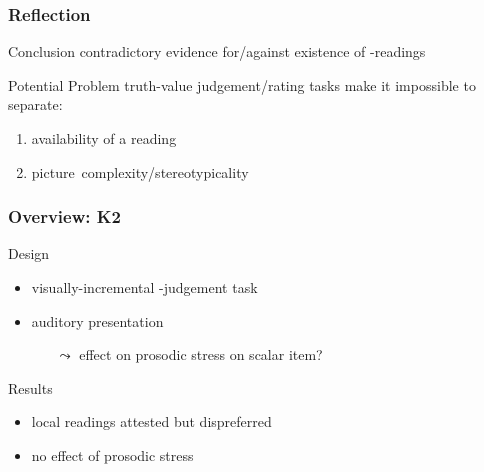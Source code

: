 \documentclass[fleqn,10pt,serif,xcolor=dvipsnames]{beamer}
\newcommand{\loc}{\acro{loc}}
\begin{document}
\begin{frame}
  \frametitle{Reflection}
  
  \begin{block}{Conclusion}
    contradictory evidence for/against existence of \loc-readings
  \end{block}
  
  \begin{block}{Potential Problem}
    truth-value judgement/rating tasks make it impossible to separate:
      \begin{enumerate}
      \item availability of a reading
      \item picture~complexity/stereotypicality \hfill {}
      \end{enumerate}

  \end{block}

\end{frame}


\begin{frame}
  \frametitle{Overview: K2}
  \begin{block}{Design}
    \begin{itemize}
    \item visually-incremental -judgement task \hfill {\color{gray}{(new?)}}
    \item auditory presentation
      \begin{itemize}
      \item[$\leadsto$] effect on prosodic stress on
      scalar item?
      \end{itemize}
    \end{itemize}
  \end{block}
  \begin{block}{Results}
    \begin{itemize}
    \item local readings attested but dispreferred
    \item no effect of prosodic stress
    \end{itemize}
  \end{block}
\end{frame}
\end{document}
